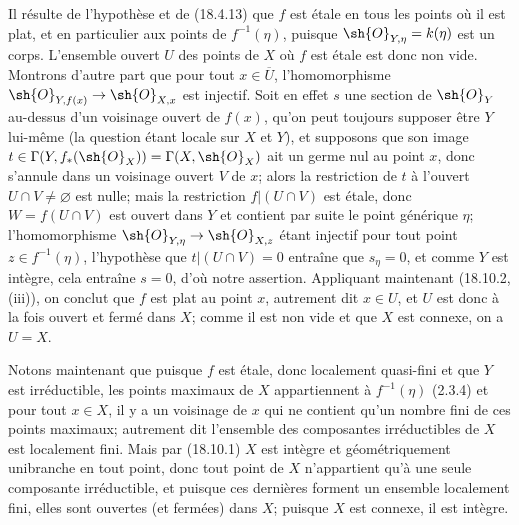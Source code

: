 Il résulte de l'hypothèse et de (18.4.13) que $f$ est étale en tous les points où il est plat, et en particulier aux points de $f^{-1}(\eta)$, puisque $\sh{O}_{Y,\eta}=k(\eta)$ est un corps. L'ensemble ouvert $U$ des points de $X$ où $f$ est étale est donc non vide. Montrons d'autre part que pour tout $x\in\overline U$, l'homomorphisme $\sh{O}_{Y,f(x)}\to\sh{O}_{X,x}$ est injectif. Soit en effet $s$ une section de $\sh{O}_Y$ au-dessus d'un voisinage ouvert de $f(x)$, qu'on peut toujours supposer être $Y$ lui-même (la question étant locale sur $X$ et $Y$), et supposons que son image $t\in\Gamma(Y,f_*(\sh{O}_X))=\Gamma(X,\sh{O}_X)$ ait un germe nul au point $x$, donc s'annule dans un voisinage ouvert $V$ de $x$; alors la restriction de $t$ à l'ouvert $U\cap V\neq\varnothing$ est nulle; mais la restriction $f|(U\cap V)$ est étale, donc $W=f(U\cap V)$ est ouvert dans $Y$ et contient par suite le point générique $\eta$; l'homomorphisme $\sh{O}_{Y,\eta}\to\sh{O}_{X,z}$ étant injectif pour tout point $z\in f^{-1}(\eta)$, l'hypothèse que $t|(U\cap V)=0$ entraîne que $s_\eta=0$, et comme $Y$ est intègre, cela entraîne $s=0$, d'où notre assertion. Appliquant maintenant (18.10.2, (iii)), on conclut que $f$ est plat au point $x$, autrement dit $x\in U$, et $U$ est donc à la fois ouvert et fermé dans $X$; comme il est non vide et que $X$ est connexe, on a $U=X$.

Notons maintenant que puisque $f$ est étale, donc localement quasi-fini et que $Y$ est irréductible, les points maximaux de $X$ appartiennent à $f^{-1}(\eta)$ (2.3.4) et pour tout $x\in X$, il y a un voisinage de $x$ qui ne contient qu'un nombre fini de ces points maximaux; autrement dit l'ensemble des composantes irréductibles de $X$ est localement fini. Mais par (18.10.1) $X$ est intègre et géométriquement unibranche en tout point, donc tout point de $X$ n'appartient qu'à une seule composante irréductible, et puisque ces dernières forment un ensemble localement fini, elles sont ouvertes (et fermées) dans $X$; puisque $X$ est connexe, il est intègre.

